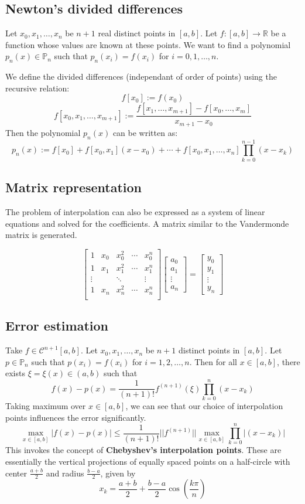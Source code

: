 \documentclass[11pt]{article}
\theoremstyle{definition}
\newcommand{\R}{\mathbb{R}}
\newcommand{\C}{\mathcal{C}}
\begin{document}
\subsection{Newton's divided differences}
Let $x_0,x_1,\dots,x_n$ be $n+1$ real distinct points in $[a,b].$ Let $f:[a,b]\to\R$ be a function whose values are known at these points. We want to find a polynomial $p_n(x)\in\mathbb{P}_n$ such that $p_n(x_i)=f(x_i)$ for $i=0,1,\dots,n$.

We define the divided differences (independant of order of points) using the recursive relation: $$f[x_0]:=f(x_0)$$$$
f[x_0,x_1,\dots,x_{m+1}]:=\frac{f[x_1,\dots,x_{m+1}]-f[x_0,\dots,x_m]}{x_{m+1}-x_0}$$
Then the polynomial $p_n(x)$ can be written as:
$$\boxed{p_n(x) := f[x_0]  + f[x_0, x_1](x - x_0)+\cdots+f[x_0,x_1,\dots,x_n]\prod_{k=0}^{n-1}(x-x_k)}$$

\subsection{Matrix representation}
The problem of interpolation can also be expressed as a system of linear equations and solved for the coefficients. A matrix similar to the Vandermonde matrix is generated.

$$\begin{bmatrix}
1 & x_0 & x_0^2 & \cdots & x_0^n\\
1 & x_1 & x_1^2 & \cdots & x_1^n\\
\vdots & & \ddots & & \vdots\\
1 & x_n & x_n^2 & \cdots & x_n^n\\
\end{bmatrix}
\begin{bmatrix}
a_0\\
a_1\\
\vdots\\
a_n
\end{bmatrix}=
\begin{bmatrix}
y_0\\
y_1\\
\vdots\\
y_n
\end{bmatrix}
$$
\subsection{Error estimation}
\label{subsec:error_eq}
Take $f\in\C^{n+1}[a,b]$. Let $x_0,x_1,\dots,x_n$ be $n+1$ distinct points in $[a,b]$. Let $p\in\mathbb{P}_n$ such that $p(x_i)=f(x_i)$ for $i=1,2,\dots,n$. Then for all $x\in[a,b]$, there exists $\xi=\xi(x)\in (a,b)$ such that
$$f(x)-p(x)=\frac{1}{(n+1)!}f^{(n+1)}(\xi)\prod_{k=0}^n (x-x_k)$$
Taking maximum over $x\in[a,b]$, we can see that our choice of interpolation points influences the error significantly.
$$\max_{x\in[a,b]}|f(x)-p(x)|\leqslant\frac{1}{(n+1)!}||f^{(n+1)}||\max_{x\in[a,b]}\prod_{k=0}^n|(x-x_k)|$$
This invokes the concept of \textbf{Chebyshev's interpolation points}. These are essentially the vertical projections of equally spaced points on a half-circle with center $\displaystyle\frac{a+b}{2}$ and radius $\displaystyle\frac{b-a}{2}$, given by $$x_k=\frac{a+b}{2}+\frac{b-a}{2}\cos\left(\frac{k\pi}{n}\right)$$
\newpage
\end{document}
